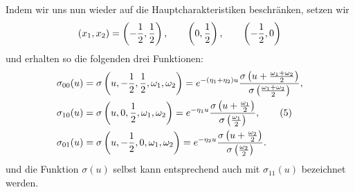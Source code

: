 \documentclass[11pt]{article}
\begin{document}
Indem wir uns nun wieder auf die Hauptcharakteristiken beschränken, setzen wir
\[
(x_1,x_2)=\left(-{1\over2},{1\over2}\right),
\qquad
\left(0,{1\over2}\right),
\qquad
\left(-{1\over2},0\right)
\]
und erhalten so die folgenden drei Funktionen:
\begin{align}
\sigma_{00}(u)&=\sigma\left(u,-{1\over2},{1\over2},\omega_1,
\omega_2\right)
=e^{-(\eta_1+
\eta_2)u}{\sigma\left(u+{\omega_1+
\omega_2\over2}\right)
\over \sigma\left({\omega_1+
\omega_2\over2}\right)},\notag\\
\sigma_{10}(u)&=\sigma\left(u,0,{1\over2},\omega_1,
\omega_2\right)
=e^{-\eta_1 u}{\sigma\left(u+{\omega_1\over2}\right)
\over \sigma\left({\omega_1\over2}\right)}, \tag{5}\\
\sigma_{01}(u)&=\sigma\left(u,-{1\over2},0,
\omega_1,
\omega_2\right)
=e^{-\eta_2 u}{\sigma\left(u+{\omega_2\over2}\right)
\over \sigma\left({\omega_2\over2}\right)}.\notag
\end{align}
und die Funktion $\sigma(u)$ selbst kann entsprechend auch mit $\sigma_{11}(u)$ bezeichnet werden.
\end{document}
